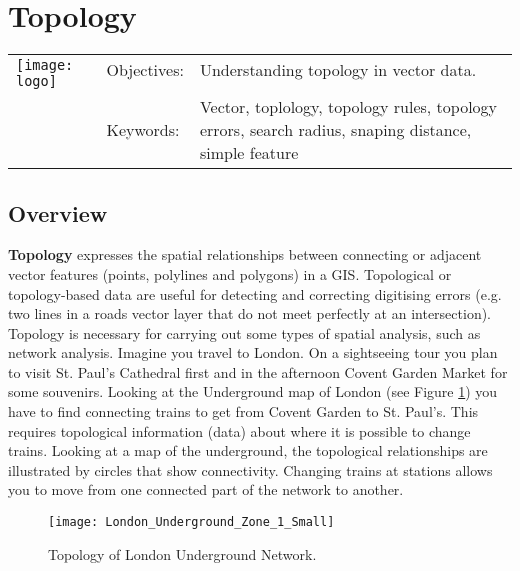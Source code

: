 

\section{Topology}\label{sec:topology}
\begin{tabular}{p{3.5cm}p{6cm}p{6cm}}
\multirow{2}{*}{\texttt{[image: logo]}} & Objectives: &
Understanding topology in vector data. \\
& & \\
& Keywords: & 
Vector, toplology, topology rules, topology errors, search radius, snaping
distance, simple feature  \\
\hline
\end{tabular}

\subsection{Overview}

\textbf{Topology} expresses the spatial relationships between connecting or
adjacent
vector features (points, polylines and polygons) in a GIS. Topological or
topology-based data are useful for detecting and correcting digitising errors
(e.g. two lines in a roads vector layer that do not meet perfectly at an
intersection). Topology is necessary for carrying out some types of spatial
analysis, such as network analysis. 
Imagine you travel to London. On a sightseeing tour you plan to visit St.
Paul's Cathedral first and in the afternoon Covent Garden Market for some
souvenirs. Looking at the Underground map of London (see Figure
\ref{fig:londontube}) you have to find connecting trains to get from Covent
Garden to St. Paul's. This requires topological information (data) about
where it is
possible to change trains. Looking at a map of the underground, the
topological relationships are illustrated by circles that show connectivity.
Changing trains at stations allows you to move from one connected part of the
network to another.

\begin{figure}[ht]
   \begin{center}
   \caption{Topology of London Underground Network.}
\label{fig:londontube}\smallskip
   \texttt{[image: London\_Underground\_Zone\_1\_Small]}
\end{center}
\end{figure}

